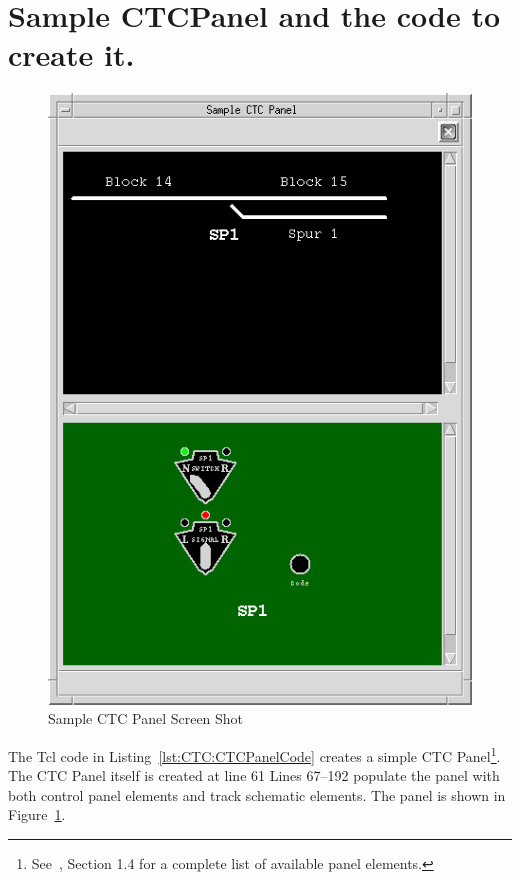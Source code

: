 \section{Sample CTCPanel and the code to create it.}


\begin{figure}[hbpt]
\begin{centering}
\includegraphics{CTCPanel.png}
\caption{Sample CTC Panel Screen Shot}
\label{fig:CTC:CTCPanelWindow}
\end{centering}
\end{figure}
The Tcl  code in Listing~\ref{lst:CTC:CTCPanelCode} creates a simple
CTC Panel\footnote{See~\cite{internals}, Section 1.4 for a complete
list of available panel elements.}. The CTC Panel itself is created at
line 61 Lines 67--192 populate the panel with both control panel
elements and track schematic elements.  The panel is shown in
Figure~\ref{fig:CTC:CTCPanelWindow}.  

